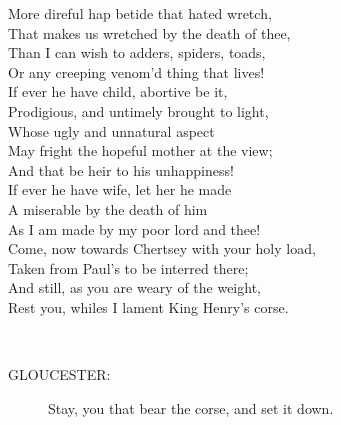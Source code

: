 \documentclass{article}
\begin{document}
\begin{description}
\hspace{1pt}More direful hap betide that hated wretch,\\
\hspace{1pt}That makes us wretched by the death of thee,\\
\hspace{1pt}Than I can wish to adders, spiders, toads,\\
\hspace{1pt}Or any creeping venom'd thing that lives!\\
\hspace{1pt}If ever he have child, abortive be it,\\
\hspace{1pt}Prodigious, and untimely brought to light,\\
\hspace{1pt}Whose ugly and unnatural aspect\\
\hspace{1pt}May fright the hopeful mother at the view;\\
\hspace{1pt}And that be heir to his unhappiness!\\
\hspace{1pt}If ever he have wife, let her he made\\
\hspace{1pt}A miserable by the death of him\\
\hspace{1pt}As I am made by my poor lord and thee!\\
\hspace{1pt}Come, now towards Chertsey with your holy load,\\
\hspace{1pt}Taken from Paul's to be interred there;\\
\hspace{1pt}And still, as you are weary of the weight,\\
\hspace{1pt}Rest you, whiles I lament King Henry's corse.\\
\end{description}
\\
\begin{description}
\item[GLOUCESTER:] 
\hspace{1pt}Stay, you that bear the corse, and set it down.\\
\end{description}
\end{document}
